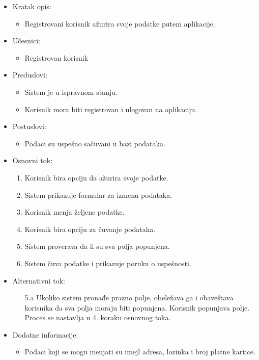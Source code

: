 \begin{itemize}
    \item Kratak opis:
        \begin{itemize}
            \item Registrovani korisnik ažurira svoje podatke putem aplikacije.
        \end{itemize}
    \item Učesnici:
        \begin{itemize}
            \item Registrovan korisnik
        \end{itemize}
    \item Preduslovi:
        \begin{itemize}
            \item Sistem je u ispravnom stanju.
            \item Korisnik mora biti registrovan i ulogovan na aplikaciju.
        \end{itemize}
    \item Postuslovi:
        \begin{itemize}
            \item Podaci su uspešno sačuvani u bazi podataka.
        \end{itemize}
    \item Osnovni tok:
        \begin{enumerate}
            \item Korisnik bira opciju da ažurira svoje podatke.
            \item Sistem prikazuje formular za izmenu podataka.
            \item Korisnik menja željene podatke. 
            \item Korisnik bira opciju za čuvanje podataka.
            \item Sistem proverava da li su sva polja popunjena.
            \item Sistem čuva podatke i prikazuje poruku o uspešnosti.
        \end{enumerate}
    \item Alternativni tok:
        \begin{itemize}
            \item[5.a] Ukoliko sistem pronađe prazno polje, obeležava ga i obaveštava korisnika da sva polja moraju biti popunjena. Korisnik popunjava polje. Proces se nastavlja u 4. koraku osnovnog toka.
        \end{itemize}
    \item Dodatne informacije:
        \begin{itemize}
            \item Podaci koji se mogu menjati su imejl adresa, lozinka i broj platne kartice.
        \end{itemize}
\end{itemize}

